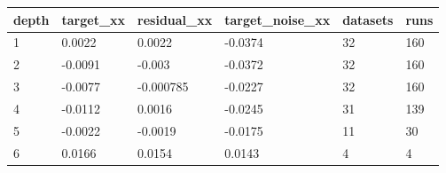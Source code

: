 \begin{tabular}{llllll}
\toprule
depth & target\_xx & residual\_xx & target\_noise\_xx & datasets & runs \\
\midrule
1 & 0.0022 & 0.0022 & -0.0374 & 32 & 160 \\
2 & -0.0091 & -0.003 & -0.0372 & 32 & 160 \\
3 & -0.0077 & -0.000785 & -0.0227 & 32 & 160 \\
4 & -0.0112 & 0.0016 & -0.0245 & 31 & 139 \\
5 & -0.0022 & -0.0019 & -0.0175 & 11 & 30 \\
6 & 0.0166 & 0.0154 & 0.0143 & 4 & 4 \\
\bottomrule
\end{tabular}
